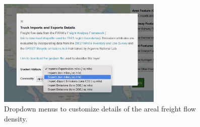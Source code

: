 \begin{figure}[ht]
        \centering
        \includegraphics[width=0.7\textwidth]{figures/popup_dropdown.png}
        \caption{Dropdown menus to customize details of the areal freight flow density.}
        \label{fig:popup_dropdown}
\end{figure}